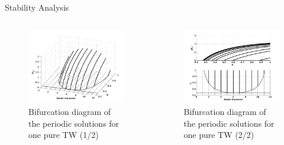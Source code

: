\documentclass[dvipsnames, aspectratio = 169]{beamer}
\begin{document}
\begin{frame}{Stability Analysis}
	\begin{columns}
		\begin{column}{0.5\textwidth}
			\begin{figure}[h!]
				\centering
				\includegraphics[width = 1\textwidth]{bifurcation_diagram.png}
				\caption{Bifurcation diagram of the periodic solutions for one pure TW (1/2)}
				\label{fig:bifurcation_diagram}
			\end{figure}
		\end{column}
		\begin{column}{0.5\textwidth}
			\begin{figure}[h!]
				\centering
				\includegraphics[width = 1\textwidth]{perspective_bif_diag.png}
				\caption{Bifurcation diagram of the periodic solutions for one pure TW (2/2)}
				\label{fig:bifurcation_diagram_details}
			\end{figure}
		\end{column}
	\end{columns}
\end{frame}
\end{document}
